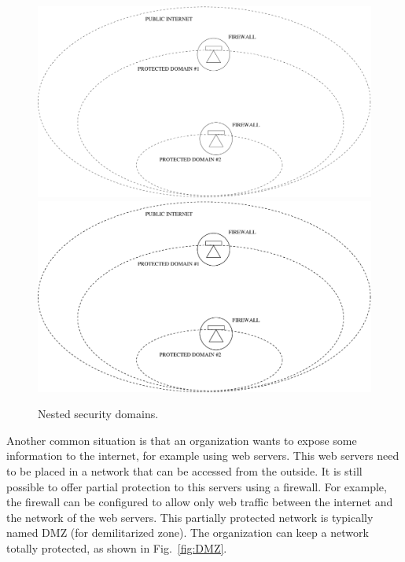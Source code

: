 \begin{figure}
\centering
\ifpdf
\includegraphics[width=0.5\linewidth]{Figures/Nested_security_domains.pdf}
\else
\includegraphics[width=0.5\linewidth]{Figures/Nested_security_domains.eps}
\fi
\caption{Nested security domains.}
\label{fig:Nested_security_domains}
\end{figure}

Another common situation is that an organization wants to expose some information to the internet, for example using web servers.
This web servers need to be placed in a network that can be accessed from the outside.
It is still possible to offer partial protection to this servers using a firewall.
For example, the firewall can be configured to allow only web traffic between the internet and the network of the web servers.
This partially protected network is typically named DMZ (for demilitarized zone).
The organization can keep a network totally protected, as shown in Fig.~\ref{fig:DMZ}.

